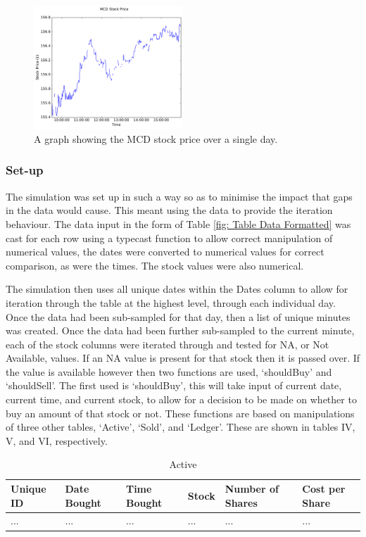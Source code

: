 \documentclass[conference]{IEEEtran}
\begin{document}
\begin{figure}
\includegraphics[width=0.5\textwidth, angle=0]{MCD.pdf}
\caption{A graph showing the MCD stock price over a single day.}
\label{fig:MCD Stock Price}
\end{figure}

\subsubsection{Set-up}

The simulation was set up in such a way so as to minimise the impact that gaps in the data would cause. This meant using the data to provide the iteration behaviour. The data input in the form of Table \ref{fig: Table Data Formatted} was cast for each row using a typecast function to allow correct manipulation of numerical values, the dates were converted to numerical values for correct comparison, as were the times. The stock values were also numerical. 

The simulation then uses all unique dates within the Dates column to allow for iteration through the table at the highest level, through each individual day. Once the data had been sub-sampled for that day, then a list of unique minutes was created. Once the data had been further sub-sampled to the current minute, each of the stock columns were iterated through and tested for NA, or Not Available, values. If an NA value is present for that stock then it is passed over. If the value is available however then two functions are used, `shouldBuy' and `shouldSell'. The first used is `shouldBuy', this will take input of current date, current time, and current stock, to allow for a decision to be made on whether to buy an amount of that stock or not. These functions are based on manipulations of three other tables, `Active', `Sold', and `Ledger'. These are shown in tables IV, V, and VI, respectively.

\begin{table}
\centering
\begin{tabu}{ |p{2.25cm}|p{2.25cm}|p{2.25cm}|p{2.25cm}|p{2.25cm}|p{2.25cm}| }\hline\hline
Unique ID & Date Bought & Time Bought & Stock & Number of Shares & Cost per Share \\ \hline
... & ... & ... & ... & ... & ... \\ \hline
\end{tabu}
\vspace{2 mm}
\caption{Active}
\label{fig: Active}
\end{table}
\end{document}

